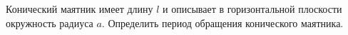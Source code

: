 Конический маятник имеет длину $l$ 
и описывает в горизонтальной плоскости 
окружность радиуса $a$.
Определить период обращения конического 
маятника.
